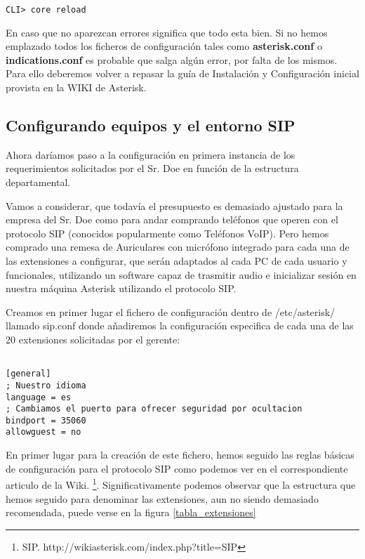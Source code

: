 \begin{lstlisting}[style=consola]
CLI> core reload
\end{lstlisting}

En caso que no aparezcan errores significa que todo esta bien. Si no hemos emplazado todos los ficheros de configuración tales como \textbf{asterisk.conf} o \textbf{indications.conf} es probable que salga algún error, por falta de los mismos. Para ello deberemos volver a repasar la guía de Instalación y Configuración inicial provista en la WIKI de Asterisk.

\newpage

\subsection{Configurando equipos y el entorno SIP}

Ahora daríamos paso a la configuración en primera instancia de los requerimientos solicitados por el Sr. Doe en función de la estructura departamental.

Vamos a considerar, que todavía el presupuesto es demasiado ajustado para la empresa del Sr. Doe como para andar comprando teléfonos que operen con el protocolo SIP \cite{johnston09} (conocidos popularmente como Teléfonos VoIP). Pero hemos comprado una remesa de Auriculares con micrófono integrado para cada una de las extensiones a configurar, que serán adaptados al cada PC de cada usuario y funcionales, utilizando un software capaz de trasmitir audio e inicializar sesión en nuestra máquina Asterisk utilizando el protocolo SIP.

Creamos en primer lugar el fichero de configuración dentro de /etc/asterisk/ llamado sip.conf donde añadiremos la configuración especifica de cada una de las 20 extensiones solicitadas por el gerente:

\begin{lstlisting}[style=bash,title={/etc/asterisk/sip.conf}]

[general]
; Nuestro idioma
language = es
; Cambiamos el puerto para ofrecer seguridad por ocultacion
bindport = 35060
allowguest = no

\end{lstlisting}

En primer lugar para la creación de este fichero, hemos seguido las reglas básicas de configuración para el protocolo SIP como podemos ver en el correspondiente articulo de la Wiki. \footnote{SIP. http://wikiasterisk.com/index.php?title=SIP}. Significativamente podemos observar que la estructura que hemos seguido para denominar las extensiones, aun no siendo demasiado recomendada, puede verse en la figura \ref{tabla_extensiones}

